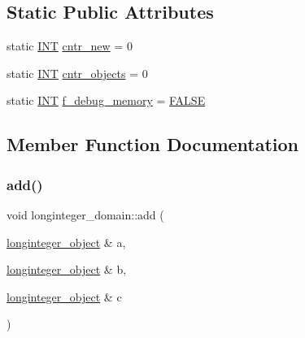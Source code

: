 \subsection*{Static Public Attributes}
\begin{DoxyCompactItemize}
\item 
static \mbox{\hyperlink{galois_8h_a09fddde158a3a20bd2dcadb609de11dc}{I\+NT}} \mbox{\hyperlink{classlonginteger__domain_a433596becc62060f7fdce9c7276d5103}{cntr\+\_\+new}} = 0
\item 
static \mbox{\hyperlink{galois_8h_a09fddde158a3a20bd2dcadb609de11dc}{I\+NT}} \mbox{\hyperlink{classlonginteger__domain_a1e9463dfe45a8476117dd260d3956eaf}{cntr\+\_\+objects}} = 0
\item 
static \mbox{\hyperlink{galois_8h_a09fddde158a3a20bd2dcadb609de11dc}{I\+NT}} \mbox{\hyperlink{classlonginteger__domain_af85736ae4f9e8a12b164533ab94f5119}{f\+\_\+debug\+\_\+memory}} = \mbox{\hyperlink{nauty_8h_aa93f0eb578d23995850d61f7d61c55c1}{F\+A\+L\+SE}}
\end{DoxyCompactItemize}


\subsection{Member Function Documentation}
\mbox{\label{classlonginteger__domain_a2b9c10fbac79f7bbbbd65c7265cdc533}} 
\subsubsection{\texorpdfstring{add()}{add()}}
{\footnotesize\ttfamily void longinteger\+\_\+domain\+::add (\begin{DoxyParamCaption}\item[{\mbox{\hyperlink{classlonginteger__object}{longinteger\+\_\+object}} \&}]{a,  }\item[{\mbox{\hyperlink{classlonginteger__object}{longinteger\+\_\+object}} \&}]{b,  }\item[{\mbox{\hyperlink{classlonginteger__object}{longinteger\+\_\+object}} \&}]{c }\end{DoxyParamCaption})}

\mbox{\label{classlonginteger__domain_af988798167147a39b87584b622442eef}} 
